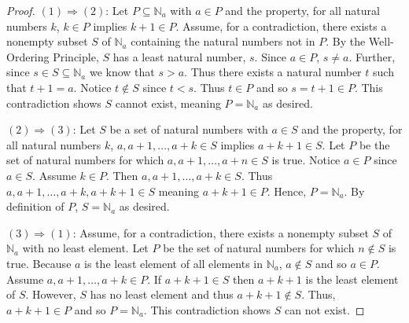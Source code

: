 \documentclass[
  twoside,
  12pt,
  letterpaper]{article}
\theoremstyle{definition}
\theoremstyle{definition}
\theoremstyle{plain}
\theoremstyle{definition}
\theoremstyle{plain}
\theoremstyle{remark}
\begin{document}
\begin{proof}

\((1)\Rightarrow (2)\): Let \(P\subseteq \mathbb{N}_a\) with \(a\in P\)
and the property, for all natural numbers \(k\), \(k\in P\) implies
\(k+1\in P\). Assume, for a contradiction, there exists a nonempty
subset \(S\) of \(\mathbb{N}_a\) containing the natural numbers not in
\(P\). By the Well-Ordering Principle, \(S\) has a least natural number,
\(s\). Since \(a\in P\), \(s\neq a\). Further, since
\(s\in S\subseteq \mathbb{N}_a\) we know that \(s>a\). Thus there exists
a natural number \(t\) such that \(t+1=a\). Notice \(t\not\in S\) since
\(t<s\). Thus \(t\in P\) and so \(s=t+1\in P\). This contradiction shows
\(S\) cannot exist, meaning \(P=\mathbb{N}_a\) as desired.

\((2)\Rightarrow (3)\): Let \(S\) be a set of natural numbers with
\(a\in S\) and the property, for all natural numbers \(k\),
\(a,a+1,\ldots,a+k\in S\) implies \(a+k+1\in S\). Let \(P\) be the set
of natural numbers for which \(a,a+1, \ldots, a+n\in S\) is true. Notice
\(a\in P\) since \(a\in S\). Assume \(k\in P\). Then
\(a,a+1, \ldots, a+k\in S\). Thus \(a,a+1,\ldots, a+k, a+k+1\in S\)
meaning \(a+k+1\in P\). Hence, \(P=\mathbb{N}_a\). By definition of
\(P\), \(S=\mathbb{N}_a\) as desired.

\((3)\Rightarrow (1)\): Assume, for a contradiction, there exists a
nonempty subset \(S\) of \(\mathbb{N}_a\) with no least element. Let
\(P\) be the set of natural numbers for which \(n\notin S\) is true.
Because \(a\) is the least element of all elements in \(\mathbb{N}_a\),
\(a\notin S\) and so \(a\in P\). Assume \(a,a+1,\ldots,a+k\in P\). If
\(a+k+1\in S\) then \(a+k+1\) is the least element of \(S\). However,
\(S\) has no least element and thus \(a+k+1\notin S\). Thus,
\(a+k+1\in P\) and so \(P=\mathbb{N}_a\). This contradiction shows \(S\)
can not exist.

\end{proof}


\printbibliography



\thispagestyle{empty}
\end{document}
